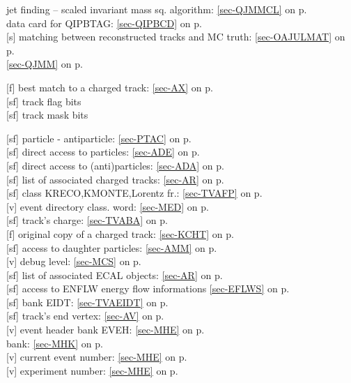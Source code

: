  
 jet finding -- scaled invariant mass sq. algorithm:
 \ref{sec-QJMMCL} on p.~\pageref{sec-QJMMCL}\\
 data card for QIPBTAG:  \ref{sec-QIPBCD} on p.~\pageref{sec-QIPBCD}\\
 [s] matching between reconstructed tracks and MC truth:
 \ref{sec-OAJULMAT} on p.~\pageref{sec-OAJULMAT}\\
 \ref{sec-QJMM} on p.~\pageref{sec-QJMM}
 
 [f] best match to a charged track: \ref{sec-AX} on p.~\pageref{sec-AX}\\
 [sf] track flag bits\\
 [sf] track mask bits
 
 [sf] particle - antiparticle: \ref{sec-PTAC} on p.~\pageref{sec-PTAC}\\
 [sf] direct access to particles: \ref{sec-ADE} on p.~\pageref{sec-ADE}\\
 [sf] direct access to (anti)particles: \ref{sec-ADA} on p.~\pageref{sec-ADA}\\
 [sf] list of associated charged tracks: \ref{sec-AR} on p.~\pageref{sec-AR}\\
 [sf] class KRECO,KMONTE,Lorentz fr.: \ref{sec-TVAFP} on p.~\pageref{sec-TVAFP}\\
 [v] event directory class. word: \ref{sec-MED} on p.~\pageref{sec-MED}\\
 [sf] track's charge: \ref{sec-TVABA} on p.~\pageref{sec-TVABA}\\
 [f] original copy of a charged track: \ref{sec-KCHT} on p.~\pageref{sec-KCHT}\\
 [sf] access to daughter particles: \ref{sec-AMM} on p.~\pageref{sec-AMM}\\
 [v] debug level: \ref{sec-MCS} on p.~\pageref{sec-MCS}\\
 [sf] list of associated ECAL objects: \ref{sec-AR} on p.~\pageref{sec-AR}\\
 [sf] access to ENFLW energy flow informations
                    \ref{sec-EFLWS} on p.~\pageref{sec-EFLWS}\\
 [sf] bank EIDT: \ref{sec-TVAEIDT} on p.~\pageref{sec-TVAEIDT}\\
 [sf] track's end vertex: \ref{sec-AV} on p.~\pageref{sec-AV}\\
 [v] event header bank EVEH: \ref{sec-MHE} on p.~\pageref{sec-MHE}\\
 bank: \ref{sec-MHK} on p.~\pageref{sec-MHK}\\
 [v] current event number: \ref{sec-MHE} on p.~\pageref{sec-MHE}\\
 [v] experiment number: \ref{sec-MHE} on p.~\pageref{sec-MHE}
 
